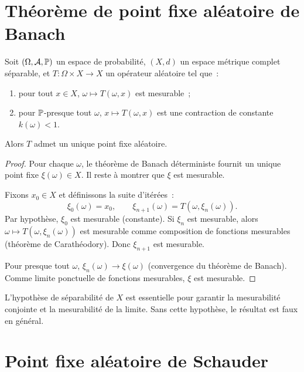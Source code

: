 \section{Th\'eor\`eme de point fixe al\'eatoire de Banach}

\begin{theoreme}
\label{thm:pf-aleatoire-banach}
Soit $(\Omega, \mathcal{A}, \mathbb{P})$ un espace de probabilit\'e, $(X, d)$ un espace m\'etrique
complet s\'eparable, et $T\colon \Omega \times X \to X$ un op\'erateur al\'eatoire tel que~:
\begin{enumerate}
  \item pour tout $x \in X$, $\omega \mapsto T(\omega, x)$ est mesurable~;
  \item pour $\mathbb{P}$-presque tout $\omega$, $x \mapsto T(\omega, x)$ est une contraction
    de constante $k(\omega) < 1$.
\end{enumerate}
Alors $T$ admet un unique point fixe al\'eatoire.
\end{theoreme}

\begin{proof}
Pour chaque $\omega$, le th\'eor\`eme de Banach d\'eterministe fournit un unique point
fixe $\xi(\omega) \in X$. Il reste \`a montrer que $\xi$ est mesurable.

Fixons $x_0 \in X$ et d\'efinissons la suite d'it\'er\'ees~:
\[
  \xi_0(\omega) = x_0, \qquad \xi_{n+1}(\omega) = T(\omega, \xi_n(\omega)).
\]
Par hypoth\`ese, $\xi_0$ est mesurable (constante). Si $\xi_n$ est mesurable, alors
$\omega \mapsto T(\omega, \xi_n(\omega))$ est mesurable comme composition de fonctions
mesurables (th\'eor\`eme de Carath\'eodory). Donc $\xi_{n+1}$ est mesurable.

Pour presque tout $\omega$, $\xi_n(\omega) \to \xi(\omega)$ (convergence du th\'eor\`eme
de Banach). Comme limite ponctuelle de fonctions mesurables, $\xi$ est mesurable.
\end{proof}

\begin{attention}
L'hypoth\`ese de s\'eparabilit\'e de $X$ est essentielle pour garantir la mesurabilit\'e
conjointe et la mesurabilit\'e de la limite. Sans cette hypoth\`ese, le r\'esultat est
faux en g\'en\'eral.
\end{attention}

\section{Point fixe al\'eatoire de Schauder}

